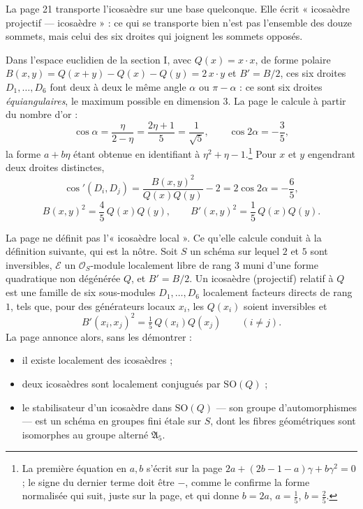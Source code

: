 \documentclass[11pt,a4paper]{article}
\begin{document}
La page 21 transporte l'icosaèdre sur une base quelconque. Elle écrit
« icosaèdre projectif --- icosaèdre » : ce qui se transporte bien n'est pas
l'ensemble des douze sommets, mais celui des six droites qui joignent les
sommets opposés.

Dans l'espace euclidien de la section I, avec $Q(x) = x \cdot x$, de forme
polaire $B(x, y) = Q(x + y) - Q(x) - Q(y) = 2\,x \cdot y$ et $B' = B/2$, ces six
droites $D_1, \ldots, D_6$ font deux à deux le même angle $\alpha$ ou
$\pi - \alpha$ : ce sont six droites \emph{équiangulaires}, le maximum possible
en dimension $3$. La page le calcule à partir du nombre d'or :
\[
\cos\alpha = \frac{\eta}{2 - \eta} = \frac{2\eta + 1}{5} = \frac{1}{\sqrt5},
\qquad \cos 2\alpha = -\frac35,
\]
la forme $a + b\eta$ étant obtenue en identifiant à
$\eta^{2} + \eta - 1$.\footnote{La première équation en $a, b$ s'écrit sur
la page $2a + (2b - 1 - a)\gamma + b\gamma^{2} = 0$ ; le signe du dernier
terme doit être $-$, comme le confirme la forme normalisée qui suit, juste
sur la page, et qui donne $b = 2a$, $a = \frac15$, $b = \frac25$.} Pour $x$ et
$y$ engendrant deux droites distinctes,
\[
\cos'(D_i, D_j) = \frac{B(x,y)^{2}}{Q(x)Q(y)} - 2 = 2\cos 2\alpha = -\frac65,
\]
\[
B(x,y)^{2} = \frac45\,Q(x)Q(y),
\qquad
B'(x,y)^{2} = \frac15\,Q(x)Q(y).
\]

La page ne définit pas l'« icosaèdre local ». Ce qu'elle calcule conduit à la
définition suivante, qui est la nôtre. Soit $S$ un schéma sur lequel $2$ et
$5$ sont inversibles, $\mathcal{E}$ un $\mathcal{O}_S$-module localement
libre de rang $3$ muni d'une forme quadratique non dégénérée $Q$, et
$B' = B/2$. Un icosaèdre (projectif) relatif à $Q$ est une famille de six
sous-modules $D_1, \ldots, D_6$ localement facteurs directs de rang $1$, tels
que, pour des générateurs locaux $x_i$, les $Q(x_i)$ soient inversibles et
\[
B'(x_i, x_j)^{2} = \tfrac15\,Q(x_i)Q(x_j)\qquad (i \neq j).
\]
La page annonce alors, sans les démontrer :

\begin{itemize}
  \item[a)] il existe localement des icosaèdres ;
  \item[b)] deux icosaèdres sont localement conjugués par $\mathrm{SO}(Q)$ ;
  \item[c)] le stabilisateur d'un icosaèdre dans $\mathrm{SO}(Q)$ --- son
  groupe d'automorphismes --- est un schéma en groupes fini étale sur $S$,
  dont les fibres géométriques sont isomorphes au groupe alterné
  $\mathfrak{A}_5$.
\end{itemize}
\end{document}
